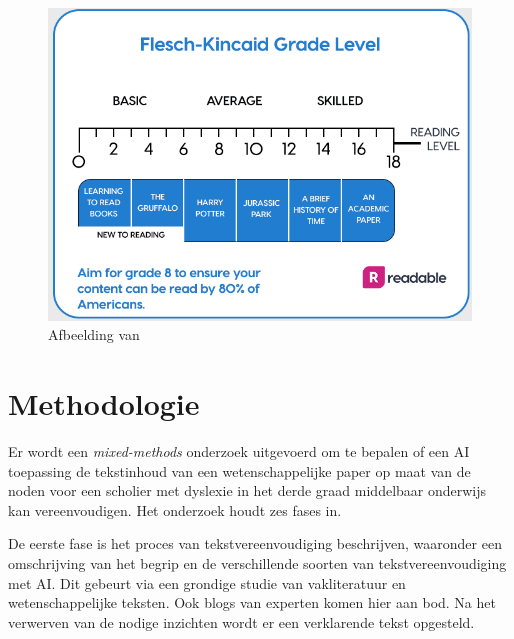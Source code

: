\begin{figure}
	\includegraphics[width=\linewidth]{img/Screenshot_302.png}
	\caption{Afbeelding van \autocite{Readable2021}}
\end{figure}


\section{Methodologie}%
\label{sec:methodologie}

Er wordt een \textit{mixed-methods} onderzoek uitgevoerd om te bepalen of een AI toepassing de tekstinhoud van een wetenschappelijke paper op maat van de noden voor een scholier met dyslexie in het derde graad middelbaar onderwijs kan vereenvoudigen. Het onderzoek houdt zes fases in. 

De eerste fase is het proces van tekstvereenvoudiging beschrijven, waaronder een omschrijving van het begrip en de verschillende soorten van tekstvereenvoudiging met AI. Dit gebeurt via een grondige studie van vakliteratuur en wetenschappelijke teksten. Ook blogs van experten komen hier aan bod. Na het verwerven van de nodige inzichten wordt er een verklarende tekst opgesteld.

